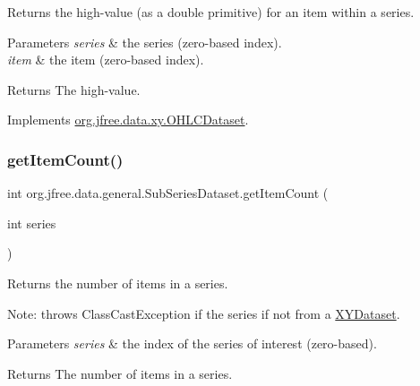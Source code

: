 Returns the high-\/value (as a double primitive) for an item within a series.


\begin{DoxyParams}{Parameters}
{\em series} & the series (zero-\/based index). \\
\hline
{\em item} & the item (zero-\/based index).\\
\hline
\end{DoxyParams}
\begin{DoxyReturn}{Returns}
The high-\/value. 
\end{DoxyReturn}


Implements \mbox{\hyperlink{interfaceorg_1_1jfree_1_1data_1_1xy_1_1_o_h_l_c_dataset_acd02ab8db72bebf0234954bd962365cb}{org.\+jfree.\+data.\+xy.\+O\+H\+L\+C\+Dataset}}.

\mbox{\label{classorg_1_1jfree_1_1data_1_1general_1_1_sub_series_dataset_ab13353a0418d82e3755c0cc7bef1cfcf}} 
\subsubsection{\texorpdfstring{get\+Item\+Count()}{getItemCount()}}
{\footnotesize\ttfamily int org.\+jfree.\+data.\+general.\+Sub\+Series\+Dataset.\+get\+Item\+Count (\begin{DoxyParamCaption}\item[{int}]{series }\end{DoxyParamCaption})}

Returns the number of items in a series. 

Note\+: throws {\ttfamily Class\+Cast\+Exception} if the series if not from a \mbox{\hyperlink{}{X\+Y\+Dataset}}.


\begin{DoxyParams}{Parameters}
{\em series} & the index of the series of interest (zero-\/based).\\
\hline
\end{DoxyParams}
\begin{DoxyReturn}{Returns}
The number of items in a series. 
\end{DoxyReturn}


